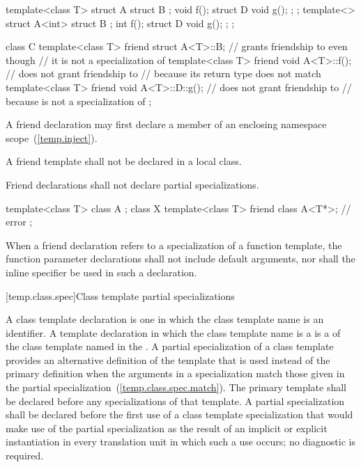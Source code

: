 \begin{codeblock}
template<class T> struct A {
  struct B { };
  void f();
  struct D {
    void g();
  };
};
template<> struct A<int> {
  struct B { };
  int f();
  struct D {
    void g();
  };
};

class C {
  template<class T> friend struct A<T>::B;    // grants friendship to  even though
                                              // it is not a specialization of 
  template<class T> friend void A<T>::f();    // does not grant friendship to 
                                              // because its return type does not match
  template<class T> friend void A<T>::D::g(); // does not grant friendship to 
                                              // because  is not a specialization of 
};
\end{codeblock}
\exitexample

\pnum
\enternote
A friend declaration may first declare a member of an enclosing namespace scope~(\ref{temp.inject}).
\exitnote

\pnum
A friend template shall not be declared in a local class.

\pnum
Friend declarations shall not declare partial specializations.
\enterexample

\begin{codeblock}
template<class T> class A { };
class X {
  template<class T> friend class A<T*>; // error
};
\end{codeblock}
\exitexample

\pnum
When a friend declaration refers to a specialization of a function
template, the function parameter declarations shall not include
default arguments, nor shall the inline specifier be used in such a
declaration.

[temp.class.spec]{Class template partial specializations}

\pnum
{}%
%
A
class template declaration is one in which the class template name is an
identifier.
A template declaration in which the class template name is a
is a
of the class template named in the
.
A partial specialization of a class template provides an alternative definition
of the template that is used instead of the primary definition when the
arguments in a specialization match those given in the partial
specialization~(\ref{temp.class.spec.match}).
The primary template shall be declared before any specializations of
that template.
A partial specialization shall be declared before the first use of a class template
specialization that would make use of the partial specialization as the result of
an implicit or explicit instantiation in every translation unit in which such a use
occurs; no diagnostic is required.

